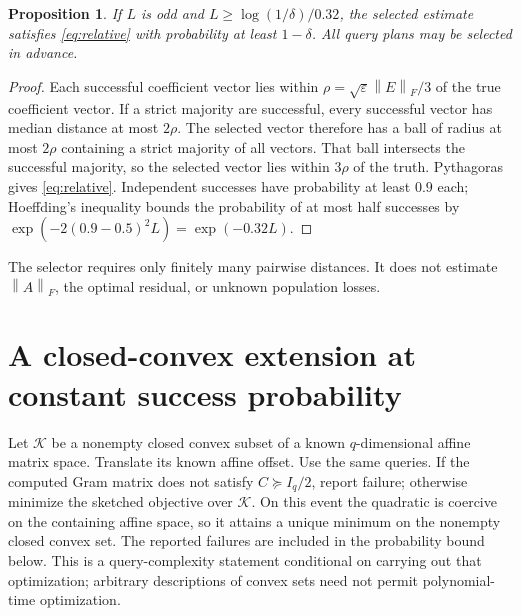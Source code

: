 \documentclass[11pt]{article}
\newtheorem{proposition}[theorem]{Proposition}
\theoremstyle{definition}
\newcommand{\norm}[1]{\left\lVert#1\right\rVert}
\newcommand{\eps}{\varepsilon}
\begin{document}
\begin{proposition}\label{prop:amplification}
If $L$ is odd and $L\ge\log(1/\delta)/0.32$, the selected estimate satisfies \eqref{eq:relative} with probability at least $1-\delta$. All query plans may be selected in advance.
\end{proposition}
\begin{proof}
Each successful coefficient vector lies within
$\rho=\sqrt{\eps}\norm E_F/3$ of the true coefficient vector. If a strict majority are successful, every successful vector has median distance at most $2\rho$. The selected vector therefore has a ball of radius at most $2\rho$ containing a strict majority of all vectors. That ball intersects the successful majority, so the selected vector lies within $3\rho$ of the truth. Pythagoras gives \eqref{eq:relative}. Independent successes have probability at least $0.9$ each; Hoeffding's inequality bounds the probability of at most half successes by $\exp(-2(0.9-0.5)^2L)=\exp(-0.32L)$.
\end{proof}

The selector requires only finitely many pairwise distances. It does not estimate $\norm A_F$, the optimal residual, or unknown population losses.

\section{A closed-convex extension at constant success probability}
Let $\mathcal K$ be a nonempty closed convex subset of a known $q$-dimensional affine matrix space. Translate its known affine offset. Use the same queries. If the computed Gram matrix does not satisfy $C\succeq I_q/2$, report failure; otherwise minimize the sketched objective over $\mathcal K$. On this event the quadratic is coercive on the containing affine space, so it attains a unique minimum on the nonempty closed convex set. The reported failures are included in the probability bound below. This is a query-complexity statement conditional on carrying out that optimization; arbitrary descriptions of convex sets need not permit polynomial-time optimization.
\end{document}
